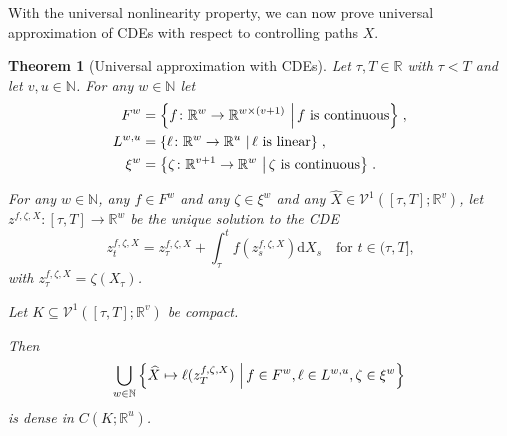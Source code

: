 \documentclass{article}
\theoremstyle{plain}
\newtheorem{thm}{Theorem}[section]
\theoremstyle{definition}
\newcommand{\reals}{\mathbb{R}}
\newcommand{\naturals}{\mathbb{N}}
\newcommand{\set}[2]{\left\{{#1}\,\left\vert\,{#2}\vphantom{{#1}}\right\}\right.}
\begin{document}
	With the universal nonlinearity property, we can now prove universal approximation of CDEs with respect to controlling paths $X$.
	\begin{thm}[Universal approximation with CDEs]\label{prop:pathwise-universal-approximation}
	Let $\tau, T \in \reals$ with $\tau < T$ and let $v, u \in \naturals$. For any $w \in \naturals$ let
	\begin{align*}
	F^w &= \set{f \colon \reals^w \to \reals^{w \times (v + 1)}}{f \text{ is continuous}},\\
	L^{w, u} &= \set{\ell \colon \reals^w \to \reals^u}{\ell \text{ is linear}},\\
	\xi^w&= \set{\zeta \colon \reals^{v + 1} \to \reals^w}{\zeta \text{ is continuous}}.
	\end{align*}
	
	For any $w \in \naturals$, any $f \in F^w$ and any $\zeta \in \xi^w$ and any $\widehat{X} \in \mathcal{V}^1([\tau, T]; \reals^v)$, let $z^{f, \zeta, X} \colon [\tau, T] \to \reals^w$ be the unique solution to the CDE
	\begin{equation*}
	z^{f, \zeta, X}_t = z^{f, \zeta, X}_\tau + \int_\tau^t f(z^{f, \zeta, X}_s) \mathrm{d}X_s\quad\text{for $t \in (\tau, T]$,}
	\end{equation*}
	with $z^{f, \zeta, X}_\tau = \zeta(X_\tau)$.
	
	Let $K \subseteq \mathcal{V}^1([\tau, T]; \reals^v)$ be compact.
	
	Then
	\begin{equation*}
	\bigcup_{w \in \naturals} \set{\widehat{X} \mapsto \ell(z^{f, \zeta, X}_T)}{f \in F^w, \ell \in L^{w, u}, \zeta \in \xi^w}
	\end{equation*}
	is dense in $C(K; \reals^u)$.
	\end{thm}
\end{document}
